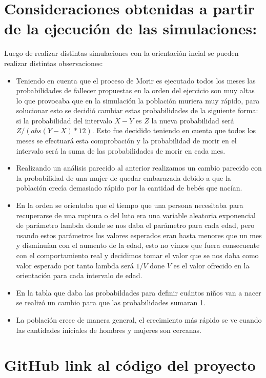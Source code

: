 \documentclass[12pt]{article}
\begin{document}
\section{Consideraciones obtenidas a partir de  la ejecuci\'on de las simulaciones:}
Luego de realizar distintas simulaciones con la orientaci\'on incial se pueden realizar distintas observaciones:
\begin{itemize}
    \item Teniendo en cuenta que el proceso de Morir es ejecutado todos los meses las probabilidades de fallecer propuestas en la orden del ejercicio son muy altas
    lo que provocaba que en la simulaci\'on la poblaci\'on muriera muy r\'apido, para solucionar esto se decidi\'o cambiar estas probabilidades de la siguiente forma: si la probabilidad del intervalo $X - Y$ es $Z$ 
    la nueva probabilidad ser\'a $Z / (abs(Y - X) * 12)$. Esto fue decidido teniendo en cuenta que todos los meses se efectuar\'a esta comprobaci\'on y la probabilidad de morir en el intervalo ser\'a la suma de las probabilidades de morir en cada mes.
    
    \item Realizando un an\'alisis parecido al anterior realizamos un cambio parecido con la probabilidad de una mujer de quedar embarazada debido a que la poblaci\'on crec\'ia demasiado r\'apido por la cantidad de beb\'es que nac\'ian.
    
    \item En la orden se orientaba que el tiempo que una persona necesitaba para recuperarse de una ruptura o del luto era una variable aleatoria exponencial de par\'ametro lambda donde se nos daba el par\'ametro para cada edad, pero usando estos par\'ametros
    los valores esperados eran hasta menores que un mes y disminu\'ian con el aumento de la edad, esto no vimos que fuera consecuente con el comportamiento real y decidimos tomar el valor que se nos daba como valor esperado por tanto lambda ser\'a $1/V$ done $V$ es el valor ofrecido 
    en la orientaci\'on para cada intervalo de edad.

    \item En la tabla que daba las probabildades para definir cu\'antos ni\~nos van a nacer se realiz\'o un cambio para que las probabilidades sumaran 1.
    
    \item La poblaci\'on crece de manera general, el crecimiento m\'as r\'apido se ve cuando las cantidades iniciales de hombres y mujeres son cercanas.
\end{itemize}

\section{GitHub link al c\'odigo del proyecto}
\end{document}
